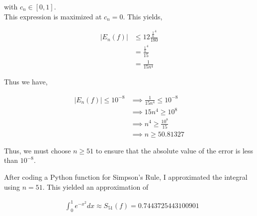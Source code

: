 \documentclass[12pt]{article}
\begin{document}
with $c_n \in [0, 1]$.\\

This expression is maximized at $c_n = 0$. This yields,

\begin{align*}
	|E_n(f)| &\leq 12\frac{\frac{1}{n}^4}{180}\\
	&= \frac{\frac{1}{n}^4}{15}\\
	&= \frac{1}{15n^4}
\end{align*}

Thus we have,

\begin{align*}
	|E_n(f)| \leq 10^{-8} &\implies \frac{1}{15n^4} \leq 10^{-8}\\
	&\implies 15n^4 \geq 10^8\\
	&\implies n^4 \geq \frac{10^8}{15}\\
	&\implies n \geq 50.81327
\end{align*}

Thus, we must choose $n \geq 51$ to ensure that the absolute value of the error is less than $10^{-8}$.

After coding a Python function for Simpson's Rule, I approximated the integral using $n = 51$. This yielded an approximation of 

\begin{align*}
	&\int_{0}^{1} e^{-x^2} dx \approx S_{51}(f) = 0.7443725443100901
\end{align*}
\end{document}
